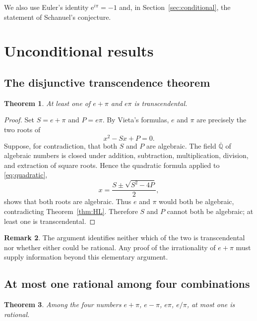 \documentclass[11pt]{amsart}
\newtheorem{theorem}{Theorem}[section]
\theoremstyle{definition}
\newtheorem{remark}[theorem]{Remark}
\theoremstyle{remark}
\numberwithin{equation}{section}
\newcommand{\Qbar}{\overline{\mathbb{Q}}}
\newcommand{\ee}{\mathrm{e}}
\begin{document}
We also use Euler's identity $\ee^{i\pi}=-1$ and, in Section~\ref{sec:conditional}, the statement of Schanuel's conjecture.

\section{Unconditional results}\label{sec:unconditional}

\subsection{The disjunctive transcendence theorem}

\begin{theorem}\label{thm:vieta}
At least one of $e+\pi$ and $e\pi$ is transcendental.
\end{theorem}

\begin{proof}
Set $S=e+\pi$ and $P=e\pi$. By Vieta's formulas, $e$ and $\pi$ are precisely the two roots of
\begin{equation}\label{eq:quadratic}
x^2-Sx+P=0.
\end{equation}
Suppose, for contradiction, that both $S$ and $P$ are algebraic. The field $\Qbar$ of algebraic numbers is closed under addition, subtraction, multiplication, division, and extraction of square roots. Hence the quadratic formula applied to \eqref{eq:quadratic},
\[
x=\frac{S\pm\sqrt{S^2-4P}}{2},
\]
shows that both roots are algebraic. Thus $e$ and $\pi$ would both be algebraic, contradicting Theorem~\ref{thm:HL}. Therefore $S$ and $P$ cannot both be algebraic; at least one is transcendental.
\end{proof}

\begin{remark}
The argument identifies neither which of the two is transcendental nor whether either could be rational. Any proof of the irrationality of $e+\pi$ must supply information beyond this elementary argument.
\end{remark}

\subsection{At most one rational among four combinations}

\begin{theorem}\label{thm:four}
Among the four numbers $e+\pi$, $e-\pi$, $e\pi$, $e/\pi$, at most one is rational.
\end{theorem}
\end{document}

